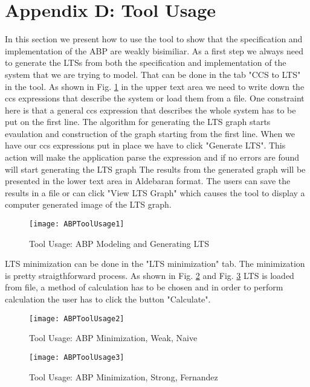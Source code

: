 \section*{Appendix D: Tool Usage}

In this section we present how to use the tool to show that the specification and 
implementation of the ABP are weakly bisimiliar. As a first step we always need to
generate the LTSs from both the specification and implementation of the system that
we are trying to model. That can be done in the tab "CCS to LTS" in the tool. As shown
in Fig. \ref{fig:abptoolusage1} in the upper text area we need to write down the ccs 
expressions that describe the system or load them from a file. One constraint here
is that a general ccs expression that describes the whole system has to be put on
the first line. The algorithm for generating the LTS graph starts evaulation and 
construction of the graph starting from the first line. When we have our ccs expressions
put in place we have to click "Generate LTS". This action will make the application
parse the expression and if no errors are found will start generating the LTS graph
The results from the generated graph will be presented in the lower text area in 
Aldebaran format. The users can save the results in a file or can click "View LTS Graph" 
which causes the tool to display a computer generated image of the LTS graph.

\begin{figure}
\centering
\texttt{[image: ABPToolUsage1]}
\caption{Tool Usage: ABP Modeling and Generating LTS}
\label{fig:abptoolusage1}
\end{figure}

LTS minimization can be done in the "LTS minimization" tab. The minimization is pretty 
straigthforward process. As shown in Fig. \ref{fig:abptoolusage2} and Fig. \ref{fig:abptoolusage3}
LTS is loaded from file, a method of calculation has to be chosen and in order to perform
calculation the user has to click the button "Calculate".

\begin{figure}
\centering
\texttt{[image: ABPToolUsage2]}
\caption{Tool Usage: ABP Minimization, Weak, Naive}
\label{fig:abptoolusage2}
\end{figure}

\begin{figure}
\centering
\texttt{[image: ABPToolUsage3]}
\caption{Tool Usage: ABP Minimization, Strong, Fernandez}
\label{fig:abptoolusage3}
\end{figure}

